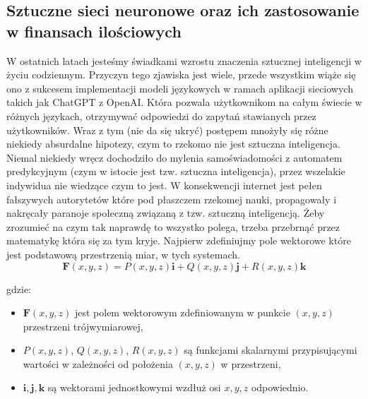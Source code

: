 \begin{enumerate}
\section{Sztuczne sieci neuronowe oraz ich zastosowanie w finansach ilościowych}

W ostatnich latach jesteśmy świadkami wzrostu znaczenia sztucznej inteligencji w życiu codziennym. Przyczyn tego zjawiska jest wiele, przede wszystkim wiąże się ono z sukcesem implementacji modeli językowych w ramach aplikacji sieciowych takich jak ChatGPT z OpenAI. Która pozwala użytkownikom na całym świecie w różnych językach, otrzymywać odpowiedzi do zapytań stawianych przez użytkowników. Wraz z tym (nie da się ukryć) postępem mnożyły się różne niekiedy absurdalne hipotezy, czym to rzekomo nie jest sztuczna inteligencja. Niemal niekiedy wręcz dochodziło do mylenia samoświadomości z automatem predykcyjnym (czym w istocie jest tzw. sztuczna inteligencja), przez wszelakie indywidua nie wiedzące czym to jest. W konsekwencji internet jest pełen fałszywych autorytetów które pod płaszczem rzekomej nauki, propagowały i nakręcały paranoje społeczną związaną z tzw. sztuczną inteligencją. 
Żeby zrozumieć na czym tak naprawdę to wszystko polega, trzeba przebrnąć przez matematykę która się za tym kryje. Najpierw zdefiniujmy pole wektorowe które jest podstawową przestrzenią miar, w tych systemach. 
\begin{equation}
\mathbf{F}(x, y, z) = P(x, y, z) \mathbf{i} + Q(x, y, z) \mathbf{j} + R(x, y, z) \mathbf{k}
\end{equation}

gdzie:
\begin{itemize}
    \item $\mathbf{F}(x, y, z)$ jest polem wektorowym zdefiniowanym w punkcie $(x, y, z)$ przestrzeni trójwymiarowej,
    \item $P(x, y, z)$, $Q(x, y, z)$, $R(x, y, z)$ są funkcjami skalarnymi przypisującymi wartości w zależności od położenia $(x, y, z)$ w przestrzeni,
    \item $\mathbf{i}, \mathbf{j}, \mathbf{k}$ są wektorami jednostkowymi wzdłuż osi $x, y, z$ odpowiednio.
\end{itemize}


\end{enumerate}

